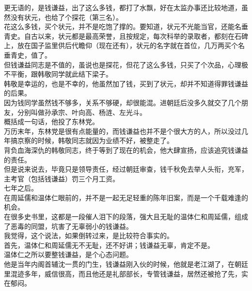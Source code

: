 \begin{multicols}{\theparacolNo}
更无语的，是钱谦益，出了这么多钱，都打了水飘，好在太监办事还比较地道，虽然没有状元，也给了个探花（第三名）。\\

花这么多钱，买个状元，并不是吃饱了撑的。要知道，状元不光能当官，还能名垂青史。自古以来，状元都是最高荣誉，且按规定，每次科举的录取者，都刻在石碑上，放在国子监里供后代瞻仰（现在还有），状元的名字就在首位，几万两买个名垂青史，值了。\\

但钱谦益同志是不值的，虽说也是探花，但花了这么多钱，只买了个次品，心理极不平衡，跟韩敬同学就此结下梁子。\\

韩敬是幸运的，也是不幸的，他虽然加了钱，买到了状元，却并不知道得罪钱谦益的后果。\\

因为钱同学虽然钱不够多，关系不够硬，却很能混。进朝廷后没多久就交了几个朋友，分别叫做孙承宗、叶向高、杨涟、左光斗。\\

概括成一句话，他投了东林党。\\

万历末年，东林党是很有点能量的，而钱谦益也并不是个很大方的人，所以没过几年搞京察的时候，韩敬同志就因为业绩不好，被整走了。\\

背负血海深仇的韩敬同志，终于等到了现在的机会，他大肆宣扬，应该追究钱谦益的责任。\\

但是说来说去，毕竟只是领导责任，经过朝廷审查，钱千秋免去举人头衔，充军，主考官（包括钱谦益）罚三个月工资。\\

七年之后。\\

在周延儒和温体仁眼前的，并不是一起无足轻重的陈年旧案，而是一个千载难逢的机会。\\

在很多史书里，这都是一段催人泪下的段落，强大且无耻的温体仁和周延儒，组成了恶毒的同盟，坑害了无辜弱小的钱谦益。\\

我觉得，这个说法，如果倒转过来，是比较符合事实的。\\

首先，温体仁和周延儒无不无耻，还不好讲；钱谦益无辜，肯定不是。\\

温体仁之所以要整钱谦益，是个心态问题。\\

他是当年内阁首辅沈一贯的门生，钱谦益刚入伙的时候，他就是老江湖了，在朝廷里混迹多年，威信很高，而且他还是礼部部长，专管钱谦益，居然还被抢了先，实在郁闷。\\


\end{multicols}
